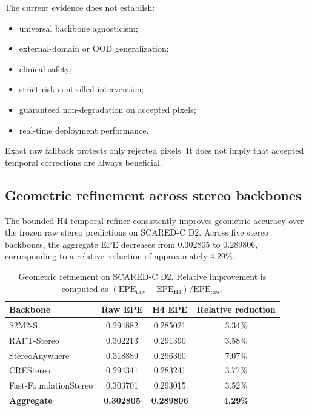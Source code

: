 \documentclass[11pt,a4paper]{article}
\begin{document}
The current evidence does not establish:

\begin{itemize}
    \item universal backbone agnosticism;
    \item external-domain or OOD generalization;
    \item clinical safety;
    \item strict risk-controlled intervention;
    \item guaranteed non-degradation on accepted pixels;
    \item real-time deployment performance.
\end{itemize}

Exact raw fallback protects only rejected pixels. It does not imply that
accepted temporal corrections are always beneficial.

\subsection{Geometric refinement across stereo backbones}

The bounded H4 temporal refiner consistently improves geometric accuracy
over the frozen raw stereo predictions on SCARED-C D2. Across five stereo
backbones, the aggregate EPE decreases from \(0.302805\) to \(0.289806\),
corresponding to a relative reduction of approximately \(4.29\%\).

\begin{table}[t]
\centering
\caption{Geometric refinement on SCARED-C D2. Relative improvement is
computed as \((\mathrm{EPE}_{\mathrm{raw}}-\mathrm{EPE}_{\mathrm{H4}})
/\mathrm{EPE}_{\mathrm{raw}}\).}
\label{tab:h4_geometry_gain}
\begin{tabular}{lccc}
\toprule
\textbf{Backbone} &
\textbf{Raw EPE} &
\textbf{H4 EPE} &
\textbf{Relative reduction} \\
\midrule
S2M2-S                  & 0.294882 & 0.285021 & 3.34\% \\
RAFT-Stereo             & 0.302213 & 0.291390 & 3.58\% \\
StereoAnywhere          & 0.318889 & 0.296360 & 7.07\% \\
CREStereo               & 0.294341 & 0.283241 & 3.77\% \\
Fast-FoundationStereo   & 0.303701 & 0.293015 & 3.52\% \\
\midrule
\textbf{Aggregate}      & \textbf{0.302805} & \textbf{0.289806} &
\textbf{4.29\%} \\
\bottomrule
\end{tabular}
\end{table}
\end{document}
